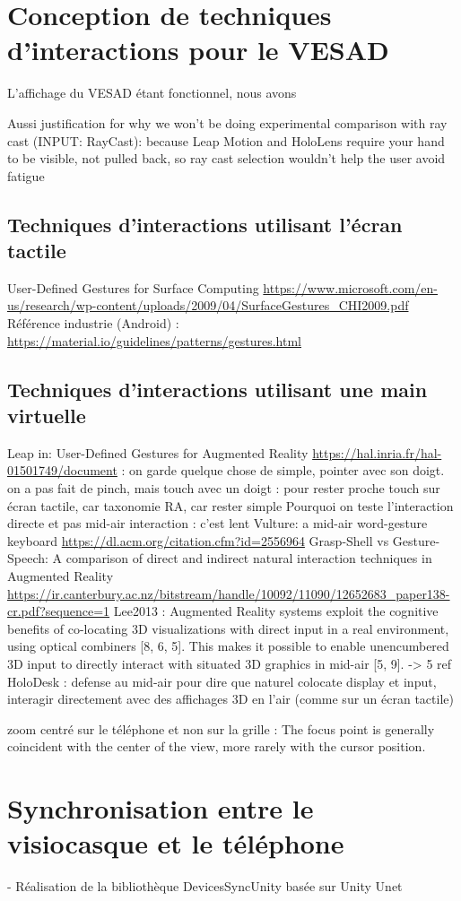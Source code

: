 \section{Conception de techniques d'interactions pour le VESAD}
L'affichage du VESAD étant fonctionnel, nous avons 

Aussi justification for why we won’t be doing experimental comparison with ray cast (INPUT: RayCast): because Leap Motion and HoloLens require your hand to be visible, not pulled back, so ray cast selection wouldn’t help the user avoid fatigue

\subsection{Techniques d'interactions utilisant l'écran tactile}
User-Defined Gestures for Surface Computing \url{https://www.microsoft.com/en-us/research/wp-content/uploads/2009/04/SurfaceGestures_CHI2009.pdf}
Référence industrie (Android) : \url{https://material.io/guidelines/patterns/gestures.html}

\subsection{Techniques d'interactions utilisant une main virtuelle}
Leap in:
User-Defined Gestures for Augmented Reality \url{https://hal.inria.fr/hal-01501749/document} : on garde quelque chose de simple, pointer avec son doigt. on a pas fait de pinch, mais touch avec un doigt : pour rester proche touch sur écran tactile, car taxonomie RA, car rester simple
Pourquoi on teste l'interaction directe et pas mid-air interaction : c'est lent Vulture: a mid-air word-gesture keyboard \url{https://dl.acm.org/citation.cfm?id=2556964}
Grasp-Shell vs Gesture-Speech: A comparison of direct and indirect natural interaction
techniques in Augmented Reality \url{https://ir.canterbury.ac.nz/bitstream/handle/10092/11090/12652683_paper138-cr.pdf?sequence=1}
Lee2013 : Augmented Reality systems exploit the cognitive benefits of co-locating 3D visualizations with direct input in a real environment, using optical combiners [8, 6, 5]. This makes it possible to enable unencumbered 3D input to directly interact with situated 3D graphics in mid-air [5, 9]. -> 5 ref HoloDesk : defense au mid-air pour dire que naturel colocate display et input, interagir directement avec des affichages 3D en l'air (comme sur un écran tactile)

zoom centré sur le téléphone et non sur la grille : The focus point is generally coincident with the center of the view, more rarely with the cursor position. \cite{Guiard2004}


\section{Synchronisation entre le visiocasque et le téléphone}

- Réalisation de la bibliothèque DevicesSyncUnity basée sur Unity Unet